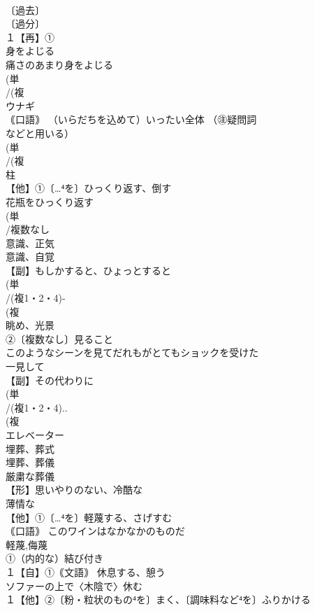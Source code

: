 \documentclass[8pt]{extreport}
\begin{document}
\begin{CJK}{UTF8}{min}
\\	〔過去〕
\\	〔過分〕
\\	１【再】①
\\	身をよじる 
\\	痛さのあまり身をよじる
\\	(単
\\	/(複
\\	ウナギ 
\\	｟口語｠ （いらだちを込めて）いったい全体 （㊟疑問詞
\\	などと用いる）
\\	(単
\\	/(複
\\	[支]柱 
\\	【他】①〔…⁴を〕ひっくり返す、倒す 
\\	花瓶をひっくり返す
\\	(単
\\	/複数なし 
\\	意識、正気 
\\	意識、自覚
\\	【副】もしかすると、ひょっとすると 
\\	(単
\\	/(複1・2・4)-
\\	(複
\\	眺め、光景 
\\	②〔複数なし〕見ること 
\\	このようなシーンを見てだれもがとてもショックを受けた 
\\	一見して
\\	【副】その代わりに 
\\	(単
\\	/(複1・2・4)..
\\	(複
\\	エレベーター 
\\	埋葬、葬式 
\\	埋葬、葬儀 
\\	厳粛な葬儀
\\	【形】思いやりのない、冷酷な　
\\	薄情な
\\	【他】①〔…⁴を〕軽蔑する、さげすむ 
\\	｟口語｠ このワインはなかなかのものだ 
\\	軽蔑,侮蔑
\\	①（内的な）結び付き
\\	１【自】①｟文語｠ 休息する、憩う 
\\	ソファーの上で〈木陰で〉休む
\\	１【他】②〔粉・粒状のもの⁴を〕まく、〔調味料など⁴を〕ふりかける 

\end{CJK}
\end{document}

